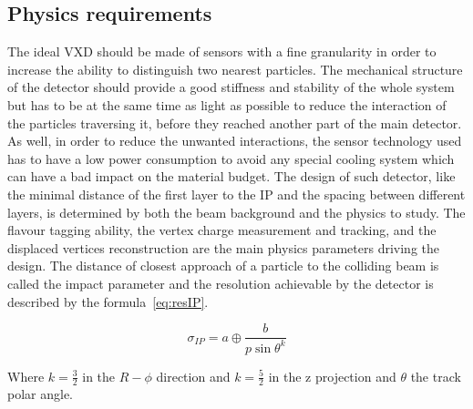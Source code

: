    \subsection{Physics requirements}
   
   The ideal \gls{VXD} should be made of sensors with a fine granularity in order to increase the ability to distinguish two nearest particles.
   The mechanical structure of the detector should provide a good stiffness and stability of the whole system but has to be at the same time as light as possible to reduce the interaction of the particles traversing it, before they reached another part of the main detector.
   As well, in order to reduce the unwanted interactions, the sensor technology used has to have a low power consumption to avoid any special cooling system which can have a bad impact on the material budget.
   The design of such detector, like the minimal distance of the first layer to the \gls{IP} and the spacing between different layers, is determined by both the beam background and the physics to study.
   The flavour tagging ability, the vertex charge measurement and tracking, and the displaced vertices reconstruction are the main physics parameters driving the design.
   The distance of closest approach of a particle to the colliding beam is called the impact parameter and the resolution achievable by the detector is described by the formula~\ref{eq:resIP}\cite{Battaglia2011}.
    
    \begin{equation}
      \sigma_{IP} = a \oplus \frac{b}{p \sin{\theta}^{k}} 
      \label{eq:resIP}
    \end{equation}

   Where $k = \frac{3}{2}$ in the $R - \phi$ direction and $k = \frac{5}{2}$ in the z projection and $\theta$ the track polar angle.

